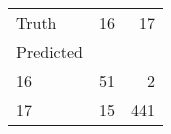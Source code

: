\begin{tabular}{lrr}
\toprule
Truth & 16 & 17 \\
Predicted &  &  \\
\midrule
16 & 51 & 2 \\
17 & 15 & 441 \\
\bottomrule
\end{tabular}
